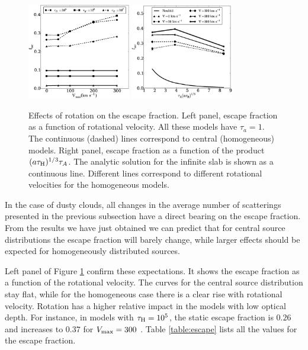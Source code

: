 \documentclass{emulateapj}
\newcommand{\kms}{{\ifmmode{{\mathrm{\,km\ s}^{-1}}}\else{\,km~s$^{-1}$}\fi}}
\begin{document}
\begin{figure}
\begin{center}
  \includegraphics[width=0.40\textwidth]{f6.eps}
  \includegraphics[width=0.40\textwidth]{f7.eps}
\end{center}
  \caption{Effects of rotation on the escape fraction. Left
    panel, escape fraction as a function of rotational velocity. All
    these models have $\tau_{a}=1$. The continuous (dashed) lines
    correspond to central (homogeneous) models. Right panel, escape
    fraction as a    function of the product $(a\tau_{\rm
      H})^{1/3}\tau_{A}$. The    analytic solution for the infinite
    slab is shown as a continuous    line. Different lines correspond
    to different rotational velocities for the homogeneous models.     
    \label{fig:efvsv}} 
\end{figure}

In the case of dusty clouds, all changes in the average number
of scatterings presented in the previous subsection have a direct
bearing on the escape fraction. From the results we have just obtained
we can predict that for central source distributions the escape
fraction will barely change, while larger effects should be expected
for homogeneously distributed sources. 

Left panel of Figure \ref{fig:efvsv} confirm these expectations. It shows the escape
fraction as a function of the rotational velocity. The curves for the
central source distribution stay flat, while for the homogeneous case
there is a clear rise with rotational velocity.  Rotation has a higher relative impact in
the models with low optical depth. For instance, in models with
$\tau_{\rm H}=10^5$, the static escape fraction is $0.26$ and increases
to $0.37$ for $V_{\rm max}=300$ \kms. Table \ref{table:escape} lists
all the values for the escape fraction. 
\end{document}
